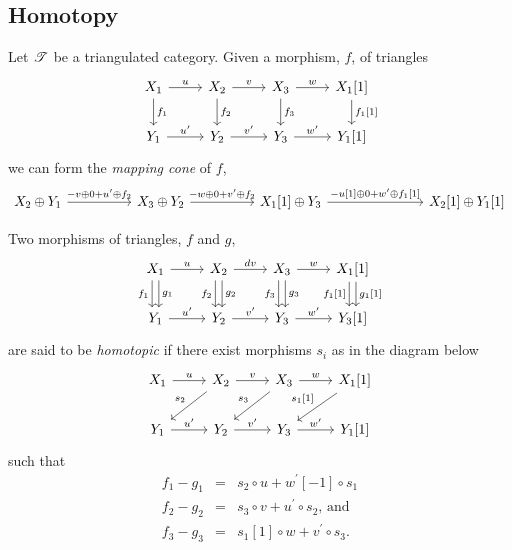 \documentclass[dissertation.tex]{subfiles}
\begin{document}
\subsection{Homotopy}
\begin{defn}
  Let $\mathscr{T}$ be a triangulated category.
  Given a morphism, $f$, of triangles
  $$\begin{tikzcd}
    X_1 \arrow{r}{u}\arrow{d}{f_1} & X_2 \arrow{r}{v}\arrow{d}{f_2} & X_3 \arrow{r}{w}\arrow{d}{f_3} & X_1[1]\arrow{d}{f_1[1]}\\
    Y_1 \arrow{r}{u^\prime} & Y_2 \arrow{r}{v^\prime} & Y_3 \arrow{r}{w^\prime} & Y_1[1]
  \end{tikzcd}$$
  we can form the {\it mapping cone} of $f$, 
  $$\begin{tikzcd}
    X_2 \oplus Y_1 \arrow{rr}{-v \oplus 0 + u^\prime \oplus f_2} & & X_3 \oplus Y_2 \arrow{rr}{-w \oplus 0 + v^\prime \oplus f_2} & & X_1[1] \oplus Y_3 \arrow{rrr}{-u[1] \oplus 0 + w^\prime \oplus f_1[1]} & & & X_2[1] \oplus Y_1[1]
  \end{tikzcd}$$
\end{defn}
\begin{defn}
  Two morphisms of triangles, $f$ and $g$,
  $$\begin{tikzcd}
    X_1 \arrow[shift left]{d}{g_1}\arrow[shift right,swap]{d}{f_1}\arrow{r}{u}
    & X_2 \arrow[shift left]{d}{g_2}\arrow[shift right,swap]{d}{f_2}\arrow{r}{dv} 
    & X_3 \arrow[shift left]{d}{g_3}\arrow[shift right,swap]{d}{f_3}\arrow{r}{w} 
    & X_1[1]\arrow[shift left]{d}{g_1[1]}\arrow[shift right,swap]{d}{f_1[1]}\\
    Y_1 \arrow{r}{u^\prime}& Y_2\arrow{r}{v^\prime} & Y_3\arrow{r}{w^\prime} & Y_3[1]
  \end{tikzcd}$$
  are said to be {\it homotopic} if there exist morphisms $s_i$ as in the diagram below
  $$\begin{tikzcd}
    X_1 \arrow{r}{u} & X_2 \arrow{r}{v}\arrow[swap]{ld}{s_2} & X_3 \arrow[swap]{ld}{s_3}\arrow{r}{w} & X_1[1] \arrow[swap]{ld}{s_1[1]}\\
    Y_1 \arrow{r}{u^\prime} & Y_2 \arrow{r}{v^\prime} & Y_3 \arrow{r}{w^\prime} & Y_1[1]
  \end{tikzcd}$$
  such that 
  \begin{eqnarray*}
    f_1 - g_1 &=& s_2 \circ u + w^\prime[-1] \circ s_1\\
    f_2 - g_2 &=& s_3 \circ v + u^\prime \circ s_2,\,\text{and}\\
    f_3 - g_3 &=& s_1[1] \circ w + v^\prime \circ s_3.
  \end{eqnarray*}
\end{defn}
\end{document}
